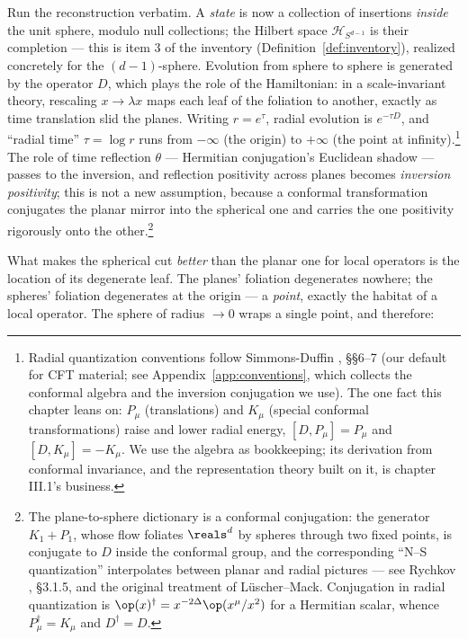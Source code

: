 Run the reconstruction verbatim. A \emph{state} is now a collection of
insertions \emph{inside} the unit sphere, modulo null collections; the Hilbert
space $\mathcal{H}_{S^{d-1}}$ is their completion --- this is item 3 of the
inventory (Definition~\ref{def:inventory}), realized concretely for the
$(d-1)$-sphere. Evolution from sphere to sphere is generated by the
 operator $D$, which plays the role of the Hamiltonian: in a
scale-invariant theory, rescaling $x \to \lambda x$ maps each leaf of the
foliation to another, exactly as time translation slid the planes. Writing $r
= e^{\tau}$, radial evolution is $e^{-\tau D}$, and ``radial time'' $\tau =
\log r$ runs from $-\infty$ (the origin) to $+\infty$ (the point at
infinity).\footnote{Radial quantization conventions follow Simmons-Duffin
, \S\S6--7 (our default for CFT material; see
Appendix~\ref{app:conventions}, which collects the conformal algebra and the
inversion conjugation we use). The one fact this chapter leans on: $P_\mu$
(translations) and $K_\mu$ (special conformal transformations) raise and lower
radial energy, $[D, P_\mu] = P_\mu$ and $[D, K_\mu] = -K_\mu$. We use the
algebra as bookkeeping; its derivation from conformal invariance, and the
representation theory built on it, is chapter III.1's business.} The role
of time reflection $\theta$ --- Hermitian conjugation's Euclidean shadow ---
passes to the inversion, and reflection positivity across planes becomes
\emph{inversion positivity}; this is not a new assumption, because a
conformal transformation conjugates the planar mirror into the spherical one
and carries the one positivity rigorously onto the
other.\footnote{The plane-to-sphere dictionary is a
conformal conjugation: the generator $K_1 + P_1$, whose flow foliates
$\reals^d$ by spheres through two fixed points, is conjugate to $D$ inside the
conformal group, and the corresponding ``N--S quantization'' interpolates
between planar and radial pictures --- see Rychkov ,
\S3.1.5, and the original treatment of L\"uscher--Mack. Conjugation in radial
quantization is $\op(x)^\dagger = x^{-2\Delta}\op(x^\mu/x^2)$ for a
Hermitian scalar, whence $P_\mu^\dagger = K_\mu$ and $D^\dagger = D$.}

What makes the spherical cut \emph{better} than the planar one for local
operators is the location of its degenerate leaf. The planes' foliation
degenerates nowhere; the spheres' foliation degenerates at the origin --- a
\emph{point}, exactly the habitat of a local operator. The sphere of radius
$\to 0$ wraps a single point, and therefore:

